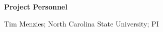 
\vspace*{\parskip}
\vspace{5mm}
\noindent \textbf{Project Personnel} 
\begin{enumerate*}
\item Tim Menzies; North Carolina State University; PI
\end{enumerate*}



